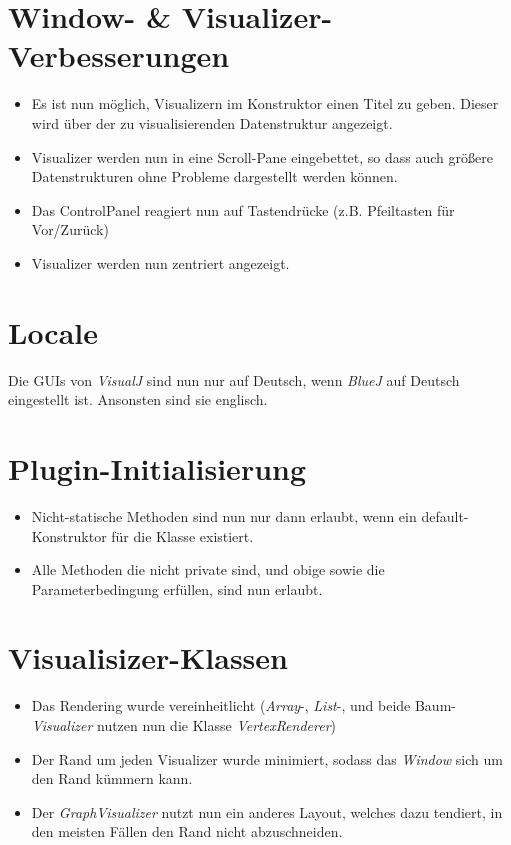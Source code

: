 \documentclass[a4paper]{report}
\begin{document}
\section{Window- \& Visualizer-Verbesserungen}

\begin{itemize}
	\item Es ist nun möglich, Visualizern im Konstruktor einen Titel zu geben. Dieser wird über der zu visualisierenden Datenstruktur angezeigt.
	\item Visualizer werden nun in eine Scroll-Pane eingebettet, so dass auch größere Datenstrukturen ohne Probleme dargestellt werden können.
	\item Das ControlPanel reagiert nun auf Tastendrücke (z.B. Pfeiltasten für Vor/Zurück)
	\item Visualizer werden nun zentriert angezeigt.
	
\end{itemize}

\section{Locale}

Die GUIs von \emph{VisualJ} sind nun nur auf Deutsch, wenn \emph{BlueJ} auf Deutsch eingestellt ist. Ansonsten sind sie englisch.

\section{Plugin-Initialisierung}
\begin{itemize}
	\item Nicht-statische Methoden sind nun nur dann erlaubt, wenn ein default-Konstruktor für die Klasse existiert.
	\item Alle Methoden die nicht private sind, und obige sowie die Parameterbedingung erfüllen, sind nun erlaubt.
\end{itemize}

\section{Visualisizer-Klassen}
\begin{itemize}
	\item Das Rendering wurde vereinheitlicht (\emph{Array}-, \emph{List}-, und beide Baum-\emph{Visualizer} nutzen nun die Klasse \emph{VertexRenderer})
	\item Der Rand um jeden Visualizer wurde minimiert, sodass das \emph{Window} sich um den Rand kümmern kann.
	\item Der \emph{GraphVisualizer} nutzt nun ein anderes Layout, welches dazu tendiert, in den meisten Fällen den Rand nicht abzuschneiden. 
\end{itemize}
\end{document}
